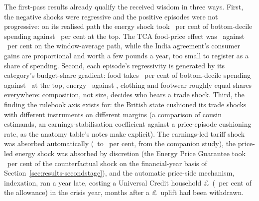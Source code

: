 The first-pass results already qualify the received wisdom in three
ways. First, the negative shocks were regressive and the positive
episodes were not progressive: on its realised path the energy shock
took \MsEnergyRealisedPctSpendDecOne\ per cent of bottom-decile
spending against \MsEnergyRealisedPctSpendDecTen\ per cent at the
top. The TCA food-price effect was
\MsTcaWindowAvgPctSpendDecOne\ against
\MsTcaWindowAvgPctSpendDecTen\ per cent on the window-average path,
while the India agreement's consumer gains are proportional and worth
a few pounds a year, too small to register as a share of spending.
Second, each episode's regressivity is generated by its category's
budget-share gradient: food takes \MsTcaBudgetSharePctDecOne\ per
cent of bottom-decile spending against \MsTcaBudgetSharePctDecTen\
at the top, energy \MsEnergyBudgetSharePctDecOne\ against
\MsEnergyBudgetSharePctDecTen, clothing and footwear roughly equal
shares everywhere: composition, not size, decides who bears a trade
shock. Third, the finding the rulebook axis exists for: the British state
cushioned its trade shocks with different instruments on different
margins (a comparison of
cousin estimands, an earnings-stabilisation coefficient against a
price-episode cushioning rate, as the anatomy table's notes make
explicit). The earnings-led tariff
shock was absorbed automatically (\MsUSTariffDisplacementCushionPct\
to \MsUSTariffWageCutCushionPct\ per cent, from the companion study),
the price-led energy shock was absorbed by discretion (the Energy
Price Guarantee took \MsEnergyCushionShareFyPct\ per cent of the
counterfactual shock on the financial-year basis of
Section~\ref{sec:results-secondstage}), and the automatic price-side mechanism, indexation, ran a
year late, costing a Universal Credit household
\pounds\MsUcLagCostGbp\ (\MsUcLagCostPctAllowance\ per cent of the
allowance) in the crisis year, months after a
\pounds\MsUcUpliftRemovalGbp\ uplift had been withdrawn.

